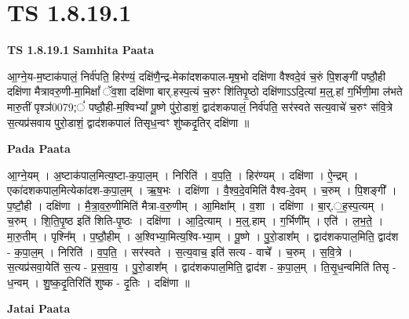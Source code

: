 \documentclass[17pt]{extarticle}
\begin{document}
\section*{ TS 1.8.19.1 }

\textbf{TS 1.8.19.1 } \newline
\textbf{Samhita Paata} \newline

आ॒ग्ने॒य-म॒ष्टाक॑पालं॒ निर्व॑पति॒ हिर॑ण्यं॒ दक्षि॑णै॒न्द्र-मेका॑दशकपाल-मृष॒भो दक्षि॑णा वैश्वदे॒वं च॒रुं पि॒शङ्गी॑ पष्ठौ॒ही दक्षि॑णा मैत्रावरु॒णी-मा॒मिक्षां᳚ ॅव॒शा दक्षि॑णा बार्.हस्प॒त्यं च॒रुꣳ शि॑तिपृ॒ष्ठो दक्षि॑णाऽऽदि॒त्यां म॒ल्॒.हां ग॒र्भिणी॒मा ल॑भते मारु॒तीं पृश्ञ॑0079;ं॑ पष्ठौ॒ही-म॒श्विभ्यां᳚ पू॒ष्णे पु॑रो॒डाशं॒ द्वाद॑शकपालं॒ निर्व॑पति॒ सर॑स्वते सत्य॒वाचे॑ च॒रुꣳ स॑वि॒त्रे स॒त्यप्र॑सवाय पुरो॒डाशं॒ द्वाद॑शकपालं तिसृध॒न्वꣳ शु॑ष्कदृ॒तिर् दक्षि॑णा ॥ \newline

\textbf{Pada Paata} \newline

आ॒ग्ने॒यम् । अ॒ष्टाक॑पाल॒मित्य॒ष्टा-क॒पा॒ल॒म् । निरिति॑ । व॒प॒ति॒ । हिर॑ण्यम् । दक्षि॑णा । ऐ॒न्द्रम् । एका॑दशकपाल॒मित्येका॑दश-क॒पा॒ल॒म् । ऋ॒ष॒भः । दक्षि॑णा । वै॒श्व॒दे॒वमिति॑ वैश्व-दे॒वम् । च॒रुम् । पि॒शङ्गी᳚ । प॒ष्टौ॒ही । दक्षि॑णा । मै॒त्रा॒व॒रु॒णीमिति॑ मैत्रा-व॒रु॒णीम् । आ॒मिक्षा᳚म् । व॒शा । दक्षि॑णा । बा॒र्.॒ह॒स्प॒त्यम् । च॒रुम् । शि॒ति॒पृ॒ष्ठ इति॑ शिति-पृ॒ष्ठः । दक्षि॑णा । आ॒दि॒त्याम् । म॒ल्॒.हाम् । ग॒र्भिणी᳚म् । एति॑ । ल॒भ॒ते॒ । मा॒रु॒तीम् । पृश्नि᳚म् । प॒ष्ठौ॒हीम् । अ॒श्विभ्या॒मित्य॒श्वि-भ्या॒म् । पू॒ष्णे । पु॒रो॒डाश᳚म् । द्वाद॑शकपाल॒मिति॒ द्वाद॑श - क॒पा॒ल॒म् । निरिति॑ । व॒प॒ति॒ । सर॑स्वते । स॒त्य॒वाच॒ इति॑ सत्य - वाचे᳚ । च॒रुम् । स॒वि॒त्रे । स॒त्यप्र॑सवा॒येति॑ स॒त्य - प्र॒स॒वा॒य॒ । पु॒रो॒डाश᳚म् । द्वाद॑शकपाल॒मिति॒ द्वाद॑श - क॒पा॒ल॒म् । ति॒सृ॒ध॒न्वमिति॑ तिसृ - ध॒न्वम् । शु॒ष्क॒दृ॒तिरिति॑ शुष्क - दृ॒तिः । दक्षि॑णा ॥  \newline



\textbf{Jatai Paata} \newline
\end{document}
